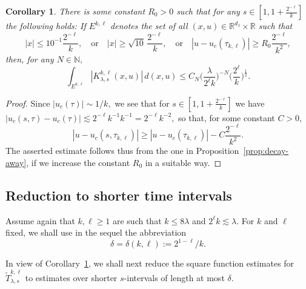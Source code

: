 \documentclass[leqno]{amsart}
\newtheorem{corollary}[theorem]{Corollary}
\theoremstyle{definition}
\theoremstyle{remark}
\numberwithin{equation}{section}
\newcommand{\R}{\mathbb{R}}
\newcommand{\N}{\mathbb{N}}
\newcommand\la{{\lambda}}
\begin{document}
\begin{corollary}\label{decaysmalls}
There is some constant $R_0 > 0$ such that for any $s \in[1,1+\frac{2^{-\ell}}k]$ the following holds: If 
$E^{k,\ell}$ denotes the set of all $(x,u)\in \R^{d_1}\times \R$ such that 
\[
|x| \leq 10^{-1}\frac{2^{-\ell}}{k}, \quad\text{or}\quad 
|x| \ge \sqrt{10 }\, \frac{2^{-\ell}}{k}, \quad\text{or}\quad 
|u-u_c (\tau_{k,\ell})|  \ge R_0  \frac{2^{-\ell}}{k^2},
\]
then, for any $N\in\N,$ 
\[
\int_{E^{k,\ell}} |K_{\lambda,s}^{k,\ell}(x,u)| \, d(x,u) \le C_N
\Big(\frac{\lambda}{2^\ell k}\Big)^{-N}\Big(\frac{2^{\ell}}{k}\Big)^{\frac{1}{2}}.
\]
\end{corollary}
\begin{proof} 
Since $|u_c(\tau)| \sim 1/k,$ we see that for  $s \in[1,1+\frac{2^{-\ell}}k]$ we have  $|u_c(s,\tau)- u_c(\tau)|\lesssim 2^{-\ell}k^{-1}  k^{-1}= 2^{-\ell}k^{-2},$ so that, for some constant $C>0, $
$$
|u-u_c (s,\tau_{k,\ell})|\ge |u-u_c (\tau_{k,\ell})|-C\frac { 2^{-\ell}}{k^2}.
$$
The asserted  estimate follows thus from the one in Proposition~\ref{prop:decay-away}, if we increase the constant $R_0$ in a suitable way.
\end{proof} 


\subsection{Reduction  to shorter  time intervals}\label{shorts}

Assume again that  $k, \ell\ge 1$ are such that $ k\le 8\la$ and $2^\ell k\lesssim \la.$
For $k$ and  $\ell$ fixed,   we shall use  in the sequel the abbreviation
\[
\delta = \delta(k,\ell) := 2^{1-\ell}/k.
\]

In view of Corollary~\ref{decaysmalls}, we shall next reduce the  square function estimates for  $\tilde T^{k,\ell}_{\la,s}$ to estimates over shorter $s$-intervals of length at most $\delta.$ 
\end{document}
